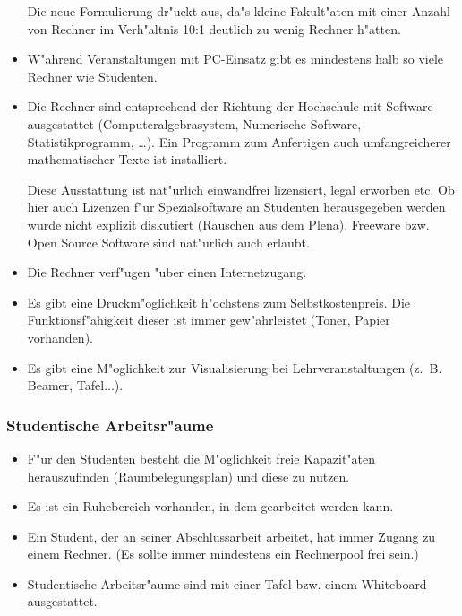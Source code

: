 \begin{itemize}
\begin{kcmt}
\begin{komacmt}
	Die neue Formulierung dr"uckt aus, da"s kleine Fakult"aten mit einer Anzahl von
	Rechner im Verh"altnis 10:1 deutlich zu wenig Rechner h"atten.
\end{komacmt}\end{kcmt}
	\item W"ahrend Veranstaltungen mit PC-Einsatz gibt es mindestens halb so viele Rechner wie Studenten.
	\item Die Rechner sind entsprechend der Richtung der Hochschule mit Software 
		ausgestattet (Computeralgebrasystem, Numerische Software, Statistikprogramm, \dots). 
		Ein Programm zum Anfertigen auch umfangreicherer mathematischer Texte ist installiert.
\begin{kcmt}\begin{komacmt}
	Diese Ausstattung ist nat"urlich einwandfrei lizensiert, legal erworben etc.
	Ob hier auch Lizenzen f"ur Spezialsoftware an Studenten herausgegeben werden
	wurde nicht explizit diskutiert (Rauschen aus dem Plena).
	Freeware bzw. Open Source Software sind nat"urlich auch erlaubt.
\end{komacmt}\end{kcmt}
	\item Die Rechner verf"ugen "uber einen Internetzugang. 
	\item Es gibt eine Druckm"oglichkeit h"ochstens zum Selbstkostenpreis. 
		Die Funktionsf"ahigkeit dieser ist immer gew"ahrleistet (Toner, Papier vorhanden).
	\item Es gibt eine M"oglichkeit zur Visualisierung bei Lehrveranstaltungen (z.~B. Beamer, Tafel...).
\end{itemize}

\subsubsection{Studentische Arbeitsr"aume}
\begin{itemize}
	\item F"ur den Studenten besteht die M"oglichkeit freie Kapazit"aten herauszufinden 
		(Raumbelegungsplan) und diese zu nutzen. 
	\item Es ist ein Ruhebereich vorhanden, in dem gearbeitet werden kann.
	\item Ein Student, der an seiner Abschlussarbeit arbeitet, hat immer Zugang zu einem Rechner. 
		(Es sollte immer mindestens ein Rechnerpool frei sein.)
	\item Studentische Arbeitsr"aume sind mit einer Tafel bzw. einem Whiteboard ausgestattet.
\end{itemize}


